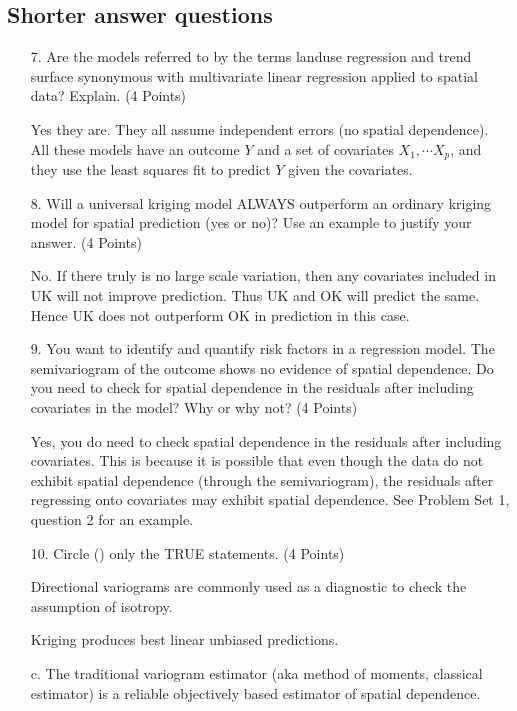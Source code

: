 \documentclass[letterpaper, 12pt]{article}
\begin{document}
\subsection*{Shorter answer questions}
\begin{enumerate}
\item[7.]
Are the models referred to by the terms landuse regression and trend surface synonymous with multivariate linear regression applied to spatial data? Explain. (4 Points)

{\sf
Yes they are. They all assume independent errors (no spatial dependence). All these models have an outcome $Y$ and a set of covariates $X_1, \cdots X_p$, and they use the least squares fit to predict $Y$ given the covariates.
}

\item[8.]
Will a universal kriging model ALWAYS outperform an ordinary kriging model for spatial prediction (yes or no)? Use an example to justify your answer. (4 Points)

{\sf
No. If there truly is no large scale variation, then any covariates included in UK will not improve prediction. Thus UK and OK will predict the same. Hence UK does not outperform OK in prediction in this case.
}

\item[9.]
You want to identify and quantify risk factors in a regression model. The semivariogram of the outcome shows no evidence of spatial dependence. Do you need to check for spatial dependence in the residuals after including covariates in the model? Why or why not? (4 Points)

{\sf
Yes, you do need to check spatial dependence in the residuals after including covariates. This is because it is possible that even though the data do not exhibit spatial dependence (through the semivariogram), the residuals after regressing onto covariates may exhibit spatial dependence. See Problem Set 1, question 2 for an example.
}

\item[10.]
Circle () only the TRUE statements. (4 Points)

Directional variograms are commonly used as a diagnostic to check the assumption of isotropy.

Kriging produces best linear unbiased predictions.

c.
The traditional variogram estimator (aka method of moments, classical estimator) is a reliable objectively based estimator of spatial dependence.


\end{enumerate}
\end{document}
